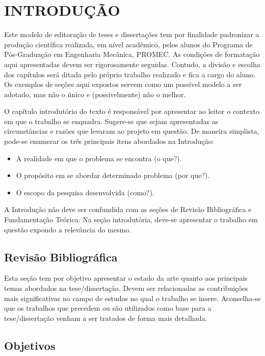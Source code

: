 \chapter{INTRODUÇÃO}

Este modelo de editoração de teses e dissertações tem por finalidade padronizar a produção científica realizada, em nível acadêmico, pelos alunos do Programa de Pós-Graduação em Engenharia Mecânica, PROMEC. As condições de formatação aqui apresentadas devem ser rigorosamente seguidas. Contudo, a divisão e escolha dos capítulos será ditada pelo próprio trabalho realizado e fica a cargo do aluno. Os exemplos de seções aqui expostos servem como um possível modelo a ser adotado, mas não o único e (possivelmente) não o melhor.
 
O capítulo introdutório do texto é responsável por apresentar ao leitor o contexto em que o trabalho se enquadra. Sugere-se que sejam apresentadas as circunstâncias e razões que levaram ao projeto em questão. De maneira simplista, pode-se enumerar os três principais itens abordados na Introdução:

\begin{itemize}
\item A realidade em que o problema se encontra (o que?).
\item O propósito em se abordar determinado problema (por que?).
\item O escopo da pesquisa desenvolvida (como?).
\end{itemize}

A Introdução não deve ser confundida com as seções de Revisão Bibliográfica e Fundamentação Teórica. Na seção introdutória, deve-se apresentar o trabalho em questão expondo a relevância do mesmo.

\section{Revisão Bibliográfica}

Esta seção tem por objetivo apresentar o estado da arte quanto aos principais temas abordados na tese/dissertação. Devem ser relacionadas as contribuições mais significativas no campo de estudos no qual o trabalho se insere. Aconselha-se que os trabalhos que precedem ou são utilizados como base para a tese/dissertação venham a ser tratados de forma mais detalhada.

\section{Objetivos}

